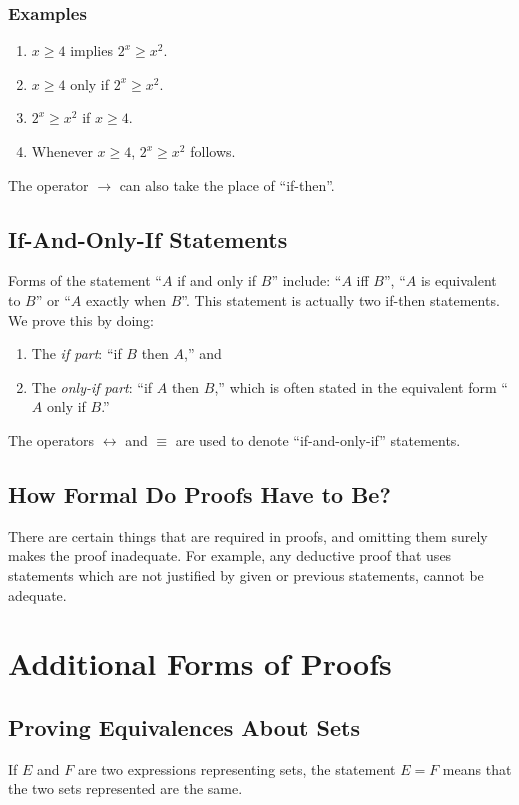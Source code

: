 \documentclass[]{article}
\begin{document}
      \subsubsection*{Examples}
        \begin{enumerate}
          \item $x \geq 4$ implies $2^x \geq x^2$.
          \item $x \geq 4$ only if $2^x \geq x^2$.
          \item $2^x \geq x^2$ if $x \geq 4$.
          \item Whenever $x \geq 4$, $2^x \geq x^2$ follows.
        \end{enumerate}
    The operator $\rightarrow$ can also take the place of ``if-then''.
    
  \subsection*{If-And-Only-If Statements}
    Forms of the statement ``$A$ if and only if $B$'' include: ``$A$ iff $B$'',
    ``$A$ is equivalent to $B$'' or ``$A$ exactly when $B$''. This statement is
    actually two if-then statements. We prove this by doing:
    \begin{enumerate}
      \item The \emph{if part}: ``if $B$ then $A$,'' and
      \item The \emph{only-if part}: ``if $A$ then $B$,'' which is often stated
      in the equivalent form ``$A$ only if $B$.''
    \end{enumerate}
    The operators $\leftrightarrow$ and $\equiv$ are used to denote 
    ``if-and-only-if'' statements.
  
  \subsection*{How Formal Do Proofs Have to Be?}
    There are certain things that are required in proofs, and omitting them
    surely makes the proof inadequate. For example, any deductive proof that
    uses statements which are not justified by given or previous statements,
    cannot be adequate.

\section*{Additional Forms of Proofs}
  \subsection*{Proving Equivalences About Sets}
    If $E$ and $F$ are two expressions representing sets, the statement
    $E = F$ means that the two sets represented are the same.
    
\end{document}
